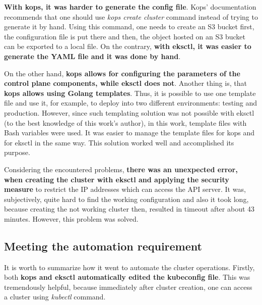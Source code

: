 \textbf{With kops, it was harder to generate the config file}. Kops' documentation recommends that one should use \textit{kops create cluster} command instead of trying to generate it by hand. Using this command, one needs to create an S3 bucket first, the configuration file is put there and then, the object hosted on an S3 bucket can be exported to a local file. On the contrary, \textbf{with eksctl, it was easier to generate the YAML file and it was done by hand}.

On the other hand, \textbf{kops allows for configuring the parameters of the control plane components, while eksctl does not}. Another thing is, that \textbf{kops allows using Golang templates}. Thus, it is possible to use one template file and use it, for example, to deploy into two different environments: testing and production. However, since such templating solution was not possible with eksctl (to the best knowledge of this work's author), in this work, template files with Bash variables were used. It was easier to manage the template files for kops and for eksctl in the same way. This solution worked well and accomplished its purpose.

Considering the encountered problems, \textbf{there was an unexpected error, when creating the cluster with eksctl and applying the security measure} to restrict the IP addresses which can access the API server. It was, subjectively, quite hard to find the working configuration and also it took long, because creating the not working cluster then, resulted in timeout after about 43 minutes. However, this problem was solved.


\subsection{Meeting the automation requirement}

It is worth to summarize how it went to automate the cluster operations. Firstly, both \textbf{kops and eksctl automatically edited the kubeconfig file}. This was tremendously helpful, because immediately after cluster creation, one can access a cluster using \textit{kubectl} command.


